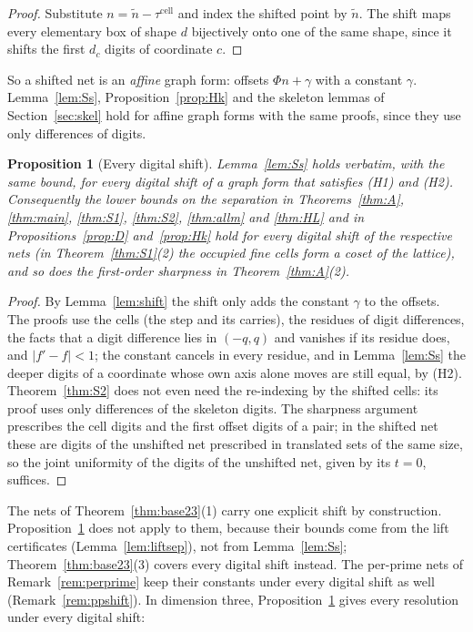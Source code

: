 \documentclass[11pt]{amsart}
\newtheorem{proposition}[theorem]{Proposition}
\theoremstyle{definition}
\theoremstyle{plain}
\begin{document}
\begin{proof}
Substitute $n=\tilde n-\tau^{\mathrm{cell}}$ and index the shifted point by $\tilde n$. The shift maps every elementary box of shape $d$ bijectively onto one of the same shape, since it shifts the first $d_c$ digits of coordinate $c$.
\end{proof}

So a shifted net is an \emph{affine} graph form: offsets $\Phi n+\gamma$ with a constant $\gamma$. Lemma~\ref{lem:Ss}, Proposition~\ref{prop:Hk} and the skeleton lemmas of Section~\ref{sec:skel} hold for affine graph forms with the same proofs, since they use only differences of digits.

\begin{proposition}[Every digital shift]\label{prop:shift}
Lemma~\ref{lem:Ss} holds verbatim, with the same bound, for every digital shift of a graph form that satisfies (H1) and (H2). Consequently the lower bounds on the separation in Theorems~\ref{thm:A}, \ref{thm:main}, \ref{thm:S1}, \ref{thm:S2}, \ref{thm:allm} and \ref{thm:HL} and in Propositions~\ref{prop:D} and~\ref{prop:Hk} hold for every digital shift of the respective nets (in Theorem~\ref{thm:S1}(2) the occupied fine cells form a coset of the lattice), and so does the first-order sharpness in Theorem~\ref{thm:A}(2).
\end{proposition}

\begin{proof}
By Lemma~\ref{lem:shift} the shift only adds the constant $\gamma$ to the offsets. The proofs use the cells (the step and its carries), the residues of digit differences, the facts that a digit difference lies in $(-q,q)$ and vanishes if its residue does, and $|f'-f|<1$; the constant cancels in every residue, and in Lemma~\ref{lem:Ss} the deeper digits of a coordinate whose own axis alone moves are still equal, by (H2). Theorem~\ref{thm:S2} does not even need the re-indexing by the shifted cells: its proof uses only differences of the skeleton digits. The sharpness argument prescribes the cell digits and the first offset digits of a pair; in the shifted net these are digits of the unshifted net prescribed in translated sets of the same size, so the joint uniformity of the digits of the unshifted net, given by its $t=0$, suffices.
\end{proof}

The nets of Theorem~\ref{thm:base23}(1) carry one explicit shift by construction. Proposition~\ref{prop:shift} does not apply to them, because their bounds come from the lift certificates (Lemma~\ref{lem:liftsep}), not from Lemma~\ref{lem:Ss}; Theorem~\ref{thm:base23}(3) covers every digital shift instead. The per-prime nets of Remark~\ref{rem:perprime} keep their constants under every digital shift as well (Remark~\ref{rem:ppshift}). In dimension three, Proposition~\ref{prop:shift} gives every resolution under every digital shift:
\end{document}
